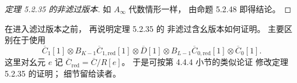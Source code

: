 \begin{proof}[定理 5.2.35 的非滤过版本]
如 $A_\infty$ 代数情形一样，
由命题 5.2.48 即得结论。
\end{proof}

在进入滤过版本之前，
再说明定理 5.2.35 的
非滤过含幺版本如何证明。
主要区别在于使用
\[
\overline C_1[1]\otimes
B_{K-1}\overline C_{1,\mathrm{red}}[1]
\otimes\overline D[1]\otimes
B_{L-1}\overline C_{0,\mathrm{red}}[1]
\otimes\overline C_0[1].
\]
这里对幺元 $e$ 记
$\overline C_{\mathrm{red}}
=\overline C/R[e]$。
于是可按第 4.4.4 小节的类似论证
修改定理 5.2.35 的证明；
细节留给读者。
